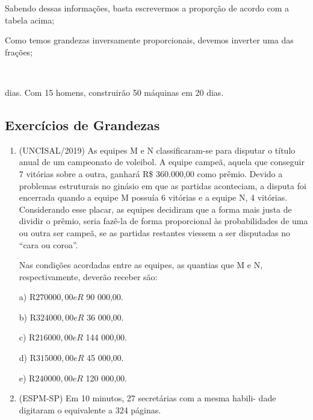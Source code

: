 \begin{multicols*}{2}
	Sabendo dessas informações, basta escrevermos a proporção de acordo com a tabela acima;

	Como temos grandezas inversamente proporcionais, devemos inverter uma das frações;

	\\



	 dias. Com 15 homens, construirão 50 máquinas em 20 dias.

	\subsection{Exercícios de Grandezas}

	\begin{enumerate}

		\item (UNCISAL/2019) As equipes M e N classificaram-se para disputar o título anual de um campeonato de voleibol. A equipe campeã, aquela que conseguir 7 vitórias sobre a outra, ganhará R\$ 360.000,00 como prêmio. Devido a problemas estruturais no ginásio em que as partidas aconteciam, a disputa foi encerrada quando a equipe M possuía 6 vitórias e a equipe N, 4 vitórias. Considerando esse placar, as equipes decidiram que a forma mais justa de dividir o prêmio, seria fazê-la de forma proporcional às probabilidades de uma ou outra ser campeã, se as partidas restantes viessem a ser disputadas no “cara ou coroa”.

		      Nas condições acordadas entre as equipes, as quantias que M e N, respectivamente, deverão receber são:

		      a)	  R$ 270 000,00 e R$ 90 000,00.

		      b)	  R$ 324 000,00 e R$ 36 000,00.

		      c)	  R$ 216 000,00 e R$ 144 000,00.

		      d)	  R$ 315 000,00 e R$ 45 000,00.

		      e)	  R$ 240 000,00 e R$ 120 000,00.

		\item (ESPM-SP) Em 10 minutos, 27 secretárias com a mesma habili- dade digitaram o equivalente a 324 páginas.


\end{enumerate}
\end{multicols*}
